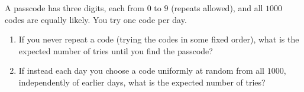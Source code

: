 A passcode has three digits, each from $0$ to $9$ (repeats allowed), and all $1000$ codes are equally likely. You try one code per day.
\begin{enumerate}
\item[(a)] If you never repeat a code (trying the codes in some fixed order), what is the expected number of tries until you find the passcode?
\item[(b)] If instead each day you choose a code uniformly at random from all $1000$, independently of earlier days, what is the expected number of tries?
\end{enumerate}
